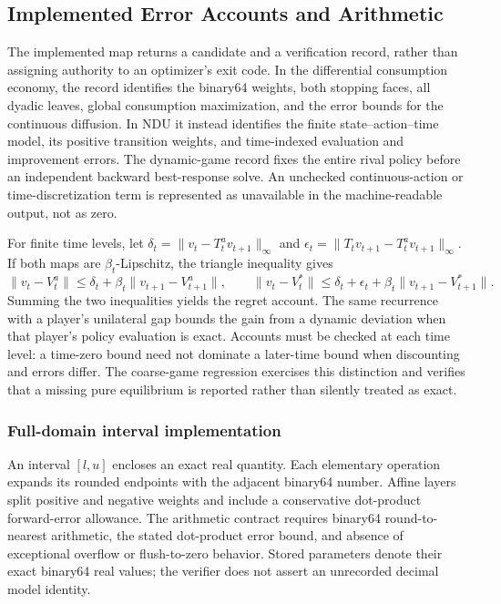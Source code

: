 \subsection{Implemented Error Accounts and Arithmetic}
The implemented map returns a candidate and a verification record, rather than assigning authority to an optimizer's exit code. In the differential consumption economy, the record identifies the binary64 weights, both stopping faces, all dyadic leaves, global consumption maximization, and the error bounds for the continuous diffusion. In NDU it instead identifies the finite state--action--time model, its positive transition weights, and time-indexed evaluation and improvement errors. The dynamic-game record fixes the entire rival policy before an independent backward best-response solve. An unchecked continuous-action or time-discretization term is represented as unavailable in the machine-readable output, not as zero.

For finite time levels, let $\delta_t=\|v_t-T_t^av_{t+1}\|_\infty$ and $\epsilon_t=\|T_tv_{t+1}-T_t^av_{t+1}\|_\infty$. If both maps are $\beta_t$-Lipschitz, the triangle inequality gives
\[
 \|v_t-V_t^a\|\leq\delta_t+\beta_t\|v_{t+1}-V_{t+1}^a\|,
 \qquad
 \|v_t-V_t^*\|\leq\delta_t+\epsilon_t+\beta_t\|v_{t+1}-V_{t+1}^*\|.
\]
Summing the two inequalities yields the regret account. The same recurrence with a player's unilateral gap bounds the gain from a dynamic deviation when that player's policy evaluation is exact. Accounts must be checked at each time level: a time-zero bound need not dominate a later-time bound when discounting and errors differ. The coarse-game regression exercises this distinction and verifies that a missing pure equilibrium is reported rather than silently treated as exact.

\subsubsection{Full-domain interval implementation}
An interval $[l,u]$ encloses an exact real quantity. Each elementary operation expands its rounded endpoints with the adjacent binary64 number. Affine layers split positive and negative weights and include a conservative dot-product forward-error allowance. The arithmetic contract requires binary64 round-to-nearest arithmetic, the stated dot-product error bound, and absence of exceptional overflow or flush-to-zero behavior. Stored parameters denote their exact binary64 real values; the verifier does not assert an unrecorded decimal model identity.

